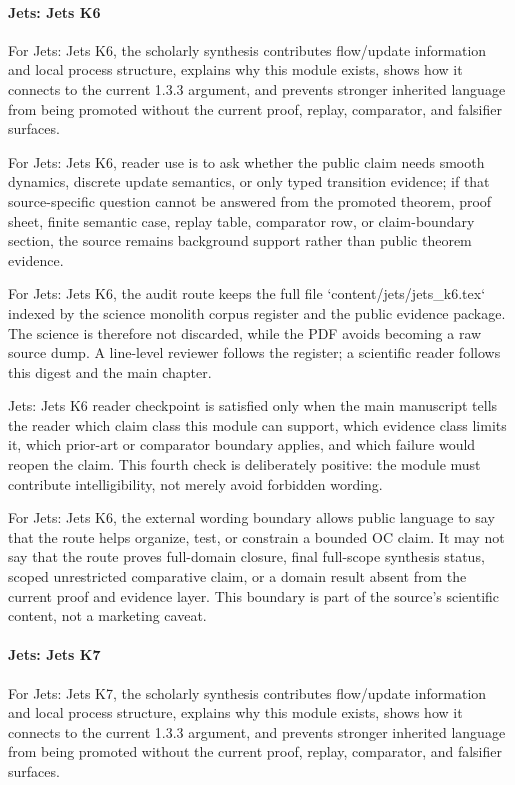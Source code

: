 \paragraph{Jets: Jets K6}

For Jets: Jets K6, the scholarly synthesis contributes flow/update information and local process structure, explains why this module exists, shows how it connects to the current 1.3.3 argument, and prevents stronger inherited language from being promoted without the current proof, replay, comparator, and falsifier surfaces.


For Jets: Jets K6, reader use is to ask whether the public claim needs smooth dynamics, discrete update semantics, or only typed transition evidence; if that source-specific question cannot be answered from the promoted theorem, proof sheet, finite semantic case, replay table, comparator row, or claim-boundary section, the source remains background support rather than public theorem evidence.


For Jets: Jets K6, the audit route keeps the full file `content/jets/jets\_k6.tex` indexed by the science monolith corpus register and the public evidence package. The science is therefore not discarded, while the PDF avoids becoming a raw source dump. A line-level reviewer follows the register; a scientific reader follows this digest and the main chapter.


Jets: Jets K6 reader checkpoint is satisfied only when the main manuscript tells the reader which claim class this module can support, which evidence class limits it, which prior-art or comparator boundary applies, and which failure would reopen the claim. This fourth check is deliberately positive: the module must contribute intelligibility, not merely avoid forbidden wording.


For Jets: Jets K6, the external wording boundary allows public language to say that the route helps organize, test, or constrain a bounded OC claim. It may not say that the route proves full-domain closure, final full-scope synthesis status, scoped unrestricted comparative claim, or a domain result absent from the current proof and evidence layer. This boundary is part of the source's scientific content, not a marketing caveat.


\paragraph{Jets: Jets K7}

For Jets: Jets K7, the scholarly synthesis contributes flow/update information and local process structure, explains why this module exists, shows how it connects to the current 1.3.3 argument, and prevents stronger inherited language from being promoted without the current proof, replay, comparator, and falsifier surfaces.


